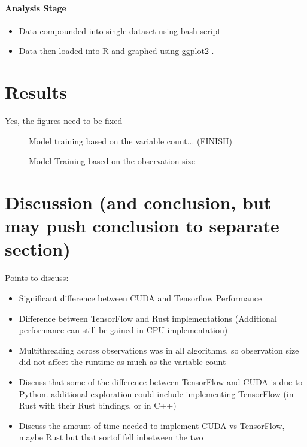 \documentclass[12pt]{article}
\begin{document}
\paragraph{Analysis Stage}


\begin{itemize}
	\item Data compounded into single dataset using bash script
	\item Data then loaded into R \cite{lang_r} and graphed using ggplot2 \cite{lib_ggplot2}.
\end{itemize}

\section{Results}

Yes, the figures need to be fixed

\begin{figure}
	\begin{center}
		
	\end{center}
	\caption{Model training based on the variable count... (FINISH)}
\end{figure}

\begin{figure}
	\begin{center}
		
	\end{center}
	\caption{Model Training based on the observation size}
\end{figure}

\section{Discussion (and conclusion, but may push conclusion to separate section)}

Points to discuss:

\begin{itemize}
	\item Significant difference between CUDA and Tensorflow Performance
	\item Difference between TensorFlow and Rust implementations (Additional performance can still be gained in CPU implementation)
	\item Multithreading across observations was in all algorithms, so observation size did  not affect the runtime as much as the variable count
	\item Discuss that some of the difference between TensorFlow and CUDA is due to Python. additional exploration could include implementing TensorFlow (in Rust with their Rust bindings, or in C++)
	\item Discuss the amount of time needed to implement CUDA vs TensorFlow, maybe Rust but that sortof fell inbetween the two
\end{itemize}
\end{document}
